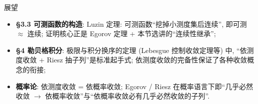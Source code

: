 
\begin{frame}{展望}

\begin{itemize}
\item \textbf{\S 3.3 可测函数的构造}: Luzin 定理: 可测函数``挖掉小测度集后连续'', 即\alert{可测 $\approx$ 连续}; 证明核心正是 Egorov 定理 + 本节选讲的``连续性继承'';
\pause
\item \textbf{\S 4 勒贝格积分}: 极限与积分换序的定理 (Lebesgue 控制收敛定理等) 中, ``依测度收敛 + Riesz 抽子列''是标准起手式; 依测度收敛的完备性保证了各种收敛概念的衔接;
\pause
\item \textbf{概率论}: 依测度收敛 = 依概率收敛; Egorov / Riesz 在概率语言下即``几乎必然收敛 $\to$ 依概率收敛''与``依概率收敛必有几乎必然收敛的子列''.
\end{itemize}

\end{frame}





